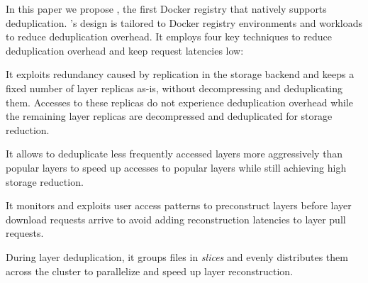In this paper we propose \sysname, the first Docker registry that natively
supports deduplication.
%
\sysname's design is tailored to Docker registry environments and workloads to
reduce deduplication overhead. It employs four key techniques to reduce
deduplication overhead and keep request latencies low:
%
%
\begin{compactenumerate}
\item It exploits redundancy caused by replication in the storage backend and keeps a fixed
number of layer replicas as-is, without decompressing and deduplicating them.
%
Accesses to these replicas do not experience deduplication overhead while
the remaining layer replicas are decompressed and deduplicated for storage reduction.
%
\item It allows to deduplicate less frequently accessed layers more
aggressively than popular layers to speed up accesses to popular
layers while still achieving high storage reduction.
%
\item It monitors and exploits user access patterns to preconstruct
layers before layer download requests arrive to avoid adding reconstruction
latencies to layer pull requests.
%
\item During layer deduplication, it groups files in \emph{slices} and evenly
distributes them across the cluster to parallelize and speed up layer reconstruction.
%
\end{compactenumerate}



%
